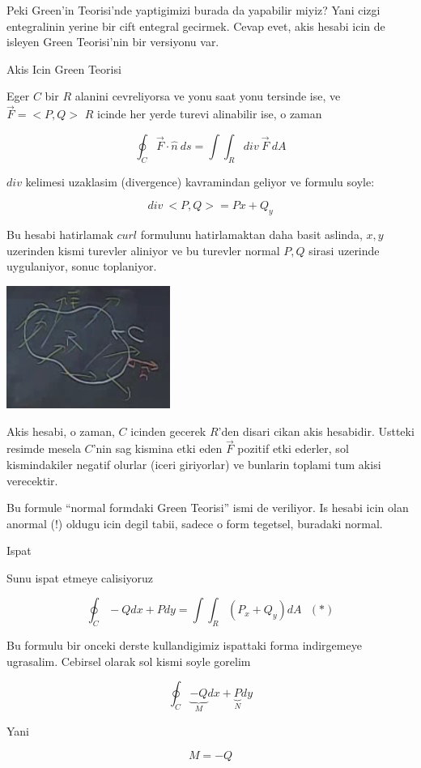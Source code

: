\documentclass[12pt,fleqn]{article}
\begin{document}
Peki Green'in Teorisi'nde yaptigimizi burada da yapabilir miyiz? Yani cizgi
entegralinin yerine bir cift entegral gecirmek. Cevap evet, akis hesabi
icin de isleyen Green Teorisi'nin bir versiyonu var. 

Akis Icin Green Teorisi

Eger $C$ bir $R$ alanini cevreliyorsa ve yonu saat yonu tersinde ise, ve
$\vec{F}=<P,Q>$ $R$ icinde her yerde turevi alinabilir ise, o zaman 

\[ \oint_C \vec{F} \cdot \hat{n} \ ds = 
\int \int_R div \ \vec{F} \ dA
\]

$div$ kelimesi uzaklasim (divergence) kavramindan geliyor ve formulu soyle:

\[ div \ <P,Q> = Px + Q_y \]

Bu hesabi hatirlamak $curl$ formulunu hatirlamaktan daha basit aslinda,
$x,y$ uzerinden kismi turevler aliniyor ve bu turevler normal $P,Q$ sirasi
uzerinde uygulaniyor, sonuc toplaniyor. 

\includegraphics[height=4cm]{23_8.png}

Akis hesabi, o zaman, $C$ icinden gecerek $R$'den disari cikan akis
hesabidir. Ustteki resimde mesela $C$'nin sag kismina etki eden $\vec{F}$
pozitif etki ederler, sol kismindakiler negatif olurlar (iceri giriyorlar)
ve bunlarin toplami tum akisi verecektir. 

Bu formule ``normal formdaki Green Teorisi'' ismi de veriliyor. Is hesabi
icin olan anormal (!) oldugu icin degil tabii, sadece o form tegetsel,
buradaki normal. 

Ispat

Sunu ispat etmeye calisiyoruz

\[ \oint_C -Qdx + Pdy = \int \int_R (P_x + Q_y) dA 
\ \ \ (*)
\]

Bu formulu bir onceki derste kullandigimiz ispattaki forma indirgemeye
ugrasalim. Cebirsel olarak sol kismi soyle gorelim

\[ \oint_C 
\underbrace{-Q}_{M}dx + 
\underbrace{P}_{N}dy 
\]

Yani 

\[ M = -Q \]
\end{document}
